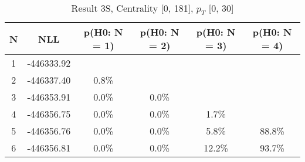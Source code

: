 \begin{table}[htb]
	\begin{center}
	\caption{Result 3S, Centrality [0, 181], $p_{T}$ [0, 30]
}
{\footnotesize\renewcommand{\arraystretch}{1.4}
		\begin{tabular}{cc||cccc}
			N & NLL & p(H0: N = 1) & p(H0: N = 2) & p(H0: N = 3) & p(H0: N = 4)\\ 
		\hline
1 & -446333.92 & & & & \\
2 & -446337.40 & 0.8\% & & & \\
3 & -446353.91 & 0.0\% & 0.0\% & & \\
4 & -446356.75 & 0.0\% & 0.0\% & 1.7\% & \\
5 & -446356.76 & 0.0\% & 0.0\% & 5.8\% & 88.8\% \\
6 & -446356.81 & 0.0\% & 0.0\% & 12.2\% & 93.7\% \\
	\end{tabular}
		\label{tab:lab}
	}
	\end{center}\end{table}

